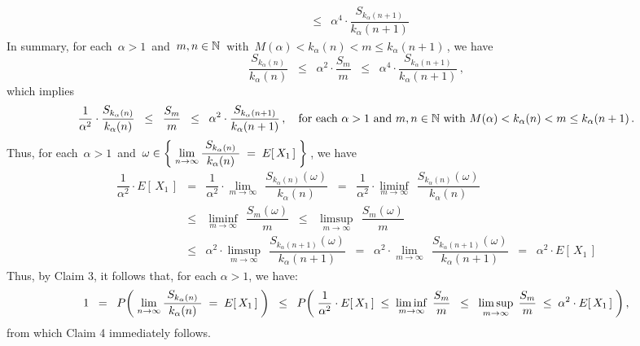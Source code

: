 \begin{enumerate}
\begin{eqnarray*}
\\
& \leq &
	\alpha^{4}\cdot\dfrac{S_{k_{\alpha}(n+1)}}{k_{\alpha}(n+1)}
\end{eqnarray*}
In summary, for each \,$\alpha > 1$\, and \,$m, n \in\mathbb{N}$\,
with \,$M(\alpha) < k_{\alpha}(n) < m \leq k_{\alpha}(n+1)$\,, we have
\begin{equation*}
\dfrac{S_{k_{\alpha}(n)}}{k_{\alpha}(n)}
\;\; \leq \;\;
	\alpha^{2}\cdot\dfrac{S_{m}}{m}
\;\; \leq \;\;
	\alpha^{4}\cdot\dfrac{S_{k_{\alpha}(n+1)}}{k_{\alpha}(n+1)}\,,
\end{equation*}
which implies
\begin{equation*}
\dfrac{1}{\alpha^{2}} \cdot \dfrac{S_{k_{\alpha}(n)}}{k_{\alpha}(n)}
\;\; \leq \;\;
	\dfrac{S_{m}}{m}
\;\; \leq \;\;
	\alpha^{2}\cdot\dfrac{S_{k_{\alpha}(n+1)}}{k_{\alpha}(n+1)}\,,
\quad
\textnormal{for each $\alpha > 1$ and $m, n \in \mathbb{N}$ with $M(\alpha) < k_{\alpha}(n) < m \leq k_{\alpha}(n+1)$}\,.
\end{equation*}
Thus, for each \,$\alpha > 1$\, and 
\,$\omega \in \left\{\;
	\underset{n\rightarrow\infty}{\lim}\,
	\dfrac{{\color{white}.}S_{k_{\alpha}(n)}{\color{white}.}}{k_{\alpha}(n)} \;=\; E[\,X_{1}\,]
	\;\right\}$\,,
we have
\begin{eqnarray*}
\dfrac{1}{\alpha^{2}} \cdot E\!\left[\,X_{1}\,\right]
& = &
	\dfrac{1}{\alpha^{2}} \cdot \underset{m\rightarrow\infty}{\lim}\;\,\dfrac{S_{k_{\alpha}(n)}(\omega)}{k_{\alpha}(n)}
	\;\; = \;\;
		\dfrac{1}{\alpha^{2}} \cdot \underset{m\rightarrow\infty}{\liminf}\;\,\dfrac{S_{k_{\alpha}(n)}(\omega)}{k_{\alpha}(n)}
\\
& \leq &
	\underset{m\rightarrow\infty}{\liminf}\;\,\dfrac{S_{m}(\omega)}{m}
	\;\; \leq \;\;
		\underset{m\rightarrow\infty}{\limsup}\;\,\dfrac{S_{m}(\omega)}{m}
\\
& \leq &
	\alpha^{2} \cdot \underset{m\rightarrow\infty}{\limsup}\;\,\dfrac{S_{k_{\alpha}(n+1)}(\omega)}{k_{\alpha}(n+1)}
	\;\; = \;\;
		\alpha^{2} \cdot \underset{m\rightarrow\infty}{\lim}\;\,\dfrac{S_{k_{\alpha}(n+1)}(\omega)}{k_{\alpha}(n+1)}
	\;\; = \;\;
		\alpha^{2} \cdot E\!\left[\,X_{1}\,\right]
\end{eqnarray*}
Thus, by Claim 3, it follows that, for each $\alpha > 1$, we have:
\begin{equation*}
1
\;\; = \;\;
	P\!\left(\;
		\underset{n\rightarrow\infty}{\lim}\,
		\dfrac{{\color{white}.}S_{k_{\alpha}(n)}{\color{white}.}}{k_{\alpha}(n)} \;=\; E[\,X_{1}\,]
		\;\right)
\;\; \leq \;\;
	P\!\left(\;
		\dfrac{1}{\alpha^{2}} \cdot E\!\left[\,X_{1}\,\right]
		\; \leq \;
			\underset{m\rightarrow\infty}{\liminf}\;\,\dfrac{S_{m}}{m}
		\;\; \leq \;\;
			\underset{m\rightarrow\infty}{\limsup}\;\,\dfrac{S_{m}}{m}
		\; \leq \;
			\alpha^{2} \cdot E\!\left[\,X_{1}\,\right]
		\;\right),
\end{equation*}
from which Claim 4 immediately follows.


\end{enumerate}
